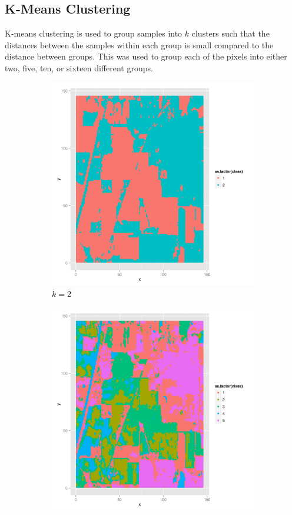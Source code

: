 \documentclass[10pt,letterpaper]{article}
\begin{document}
\subsection{K-Means Clustering}
K-means clustering is used to group samples into $k$ clusters such that the distances between the samples within each group is small compared to the distance between groups. This was used to group each of the pixels into either two, five, ten, or sixteen different groups.
\begin{figure}
\begin{center}
\begin{subfigure}[b]{0.24\textwidth}
\includegraphics[width=\textwidth]{../Presentation/km2.png}
\caption{$k=2$}
\end{subfigure}
\begin{subfigure}[b]{0.24\textwidth}
\includegraphics[width=\textwidth]{../Presentation/km5.png}

\end{subfigure}
\end{center}
\end{figure}
\end{document}
